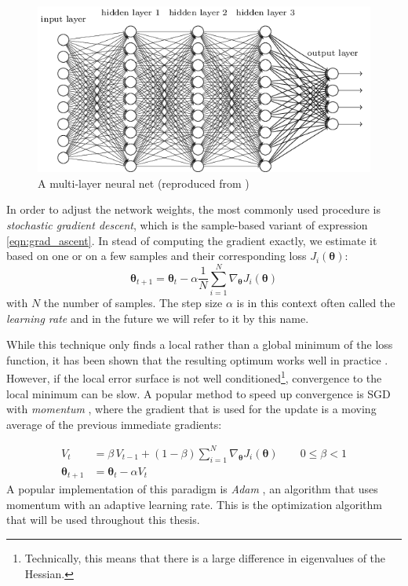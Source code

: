 \begin{figure}[htp]
    \centering
    \includegraphics[width=12cm]{images/neural_net.png}
    \caption{A multi-layer neural net (reproduced from \cite{nielsen2015neural})}
    \label{fig:neural_net}
\end{figure}

In order to adjust the network weights, the most commonly used procedure is \emph{stochastic gradient descent}, which is the sample-based variant of expression \ref{eqn:grad_ascent}. In stead of computing the gradient exactly, we estimate it based on one or on a few samples and their corresponding loss $J_{i}(\bm{\theta})$: 
\begin{equation}
    \label{eqn:sgd}
    \bm{\theta}_{t+1} = \bm{\theta}_{t} - \alpha \frac{1}{N} \sum_{i=1}^{N} \nabla_{\bm{\theta}} J_{i}(\bm{\theta})
\end{equation}
with $N$ the number of samples. The step size $\alpha$ is in this context often called the \emph{learning rate} and in the future we will refer to it by this name.

While this technique only finds a local rather than a global minimum of the loss function, it has been shown that the resulting optimum works well in practice \cite{bottou2010large}.  However, if the local error surface is not well conditioned\footnote{Technically, this means that there is a large difference in eigenvalues of the Hessian.}, convergence to the local minimum can be slow. A popular method to speed up convergence is SGD with \emph{momentum} \cite{qian1999momentum}, where the gradient that is used for the update is a moving average of the previous immediate gradients:

\begin{align*}
        V_t &= \beta \, V_{t-1} + (1-\beta) \sum_{i=1}^{N} \nabla_{\bm{\theta}} J_{i}(\bm{\theta}) \quad \quad 0 \leq \beta < 1\\
        \bm{\theta}_{t+1} &= \bm{\theta}_{t} - \alpha V_t
\end{align*}
A popular implementation of this paradigm is \emph{Adam} \cite{kingma2014adam}, an algorithm that uses momentum with an adaptive learning rate. This is the optimization algorithm that will be used throughout this thesis.

